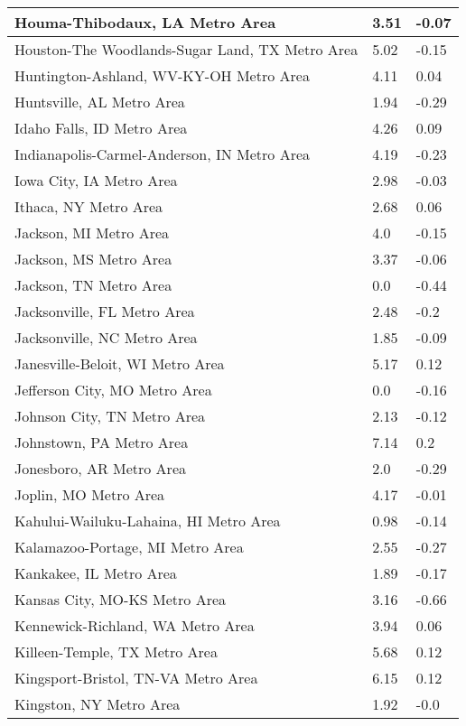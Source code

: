 \documentclass[12pt,oneside, letterpaper]{book}
\begin{document}
\begin{longtable}{| p{} | p{} | p{} |}
    Houma-Thibodaux, LA Metro Area & 3.51 & -0.07 \\ \hline
    Houston-The Woodlands-Sugar Land, TX Metro Area & 5.02 & -0.15 \\ \hline
    Huntington-Ashland, WV-KY-OH Metro Area & 4.11 & 0.04 \\ \hline
    Huntsville, AL Metro Area & 1.94 & -0.29 \\ \hline
    Idaho Falls, ID Metro Area & 4.26 & 0.09 \\ \hline
    Indianapolis-Carmel-Anderson, IN Metro Area & 4.19 & -0.23 \\ \hline
    Iowa City, IA Metro Area & 2.98 & -0.03 \\ \hline
    Ithaca, NY Metro Area & 2.68 & 0.06 \\ \hline
    Jackson, MI Metro Area & 4.0 & -0.15 \\ \hline
    Jackson, MS Metro Area & 3.37 & -0.06 \\ \hline
    Jackson, TN Metro Area & 0.0 & -0.44 \\ \hline
    Jacksonville, FL Metro Area & 2.48 & -0.2 \\ \hline
    Jacksonville, NC Metro Area & 1.85 & -0.09 \\ \hline
    Janesville-Beloit, WI Metro Area & 5.17 & 0.12 \\ \hline
    Jefferson City, MO Metro Area & 0.0 & -0.16 \\ \hline
    Johnson City, TN Metro Area & 2.13 & -0.12 \\ \hline
    Johnstown, PA Metro Area & 7.14 & 0.2 \\ \hline
    Jonesboro, AR Metro Area & 2.0 & -0.29 \\ \hline
    Joplin, MO Metro Area & 4.17 & -0.01 \\ \hline
    Kahului-Wailuku-Lahaina, HI Metro Area & 0.98 & -0.14 \\ \hline
    Kalamazoo-Portage, MI Metro Area & 2.55 & -0.27 \\ \hline
    Kankakee, IL Metro Area & 1.89 & -0.17 \\ \hline
    Kansas City, MO-KS Metro Area & 3.16 & -0.66 \\ \hline
    Kennewick-Richland, WA Metro Area & 3.94 & 0.06 \\ \hline
    Killeen-Temple, TX Metro Area & 5.68 & 0.12 \\ \hline
    Kingsport-Bristol, TN-VA Metro Area & 6.15 & 0.12 \\ \hline
    Kingston, NY Metro Area & 1.92 & -0.0 \\ \hline

\end{longtable}
\end{document}
